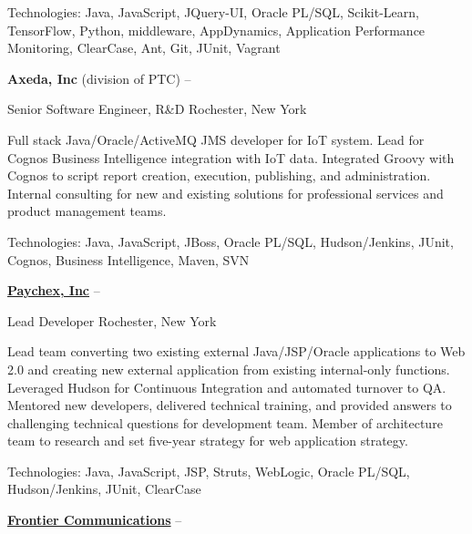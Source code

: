 \documentclass[letterpaper,MMMMyyyy,nonstopmode]{simpleresumecv}
\begin{document}
\begin{Body}
\begin{Detail}
\Gap
Technologies: Java, JavaScript, JQuery-UI, Oracle PL/SQL, Scikit-Learn, TensorFlow, Python, middleware, AppDynamics, Application Performance Monitoring, ClearCase, Ant, Git, JUnit, Vagrant
\end{Detail}
\fi

\BigGap

\Entry
\textbf{Axeda, Inc} (division of PTC)
\hfill 
{} --  

Senior Software Engineer, R\&D
\hfill
Rochester, New York

\begin{Detail}
\BulletItem
Full stack Java/Oracle/ActiveMQ JMS developer for IoT system.
\BulletItem
Lead for Cognos Business Intelligence integration with IoT data. Integrated Groovy with Cognos to script report creation, execution, publishing, and administration.
\BulletItem
Internal consulting for new and existing solutions for professional services and product management teams.

\Gap
Technologies: Java, JavaScript, JBoss, Oracle PL/SQL, Hudson/Jenkins, JUnit, Cognos, Business Intelligence, Maven, SVN
\end{Detail}

\BigGap
\Entry
\href{http://www.paychex.com/}
{\textbf{Paychex, Inc}}
\hfill 
 -- 

Lead Developer
\hfill
Rochester, New York

\begin{Detail}
\BulletItem
Lead team converting two existing external Java/JSP/Oracle applications to Web 2.0 and creating new external application from existing internal-only functions. Leveraged Hudson for Continuous Integration and automated turnover to QA.
\BulletItem
Mentored new developers, delivered technical training, and provided answers to challenging technical questions for development team.
\BulletItem
Member of architecture team to research and set five-year strategy for web application strategy.

\Gap
Technologies: Java, JavaScript, JSP, Struts, WebLogic, Oracle PL/SQL, Hudson/Jenkins, JUnit, ClearCase
\end{Detail}

\BigGap
\Entry
\href{http://www.frontier.com/}
{\textbf{Frontier Communications}}
\hfill 
 -- 


\end{Body}
\end{document}
